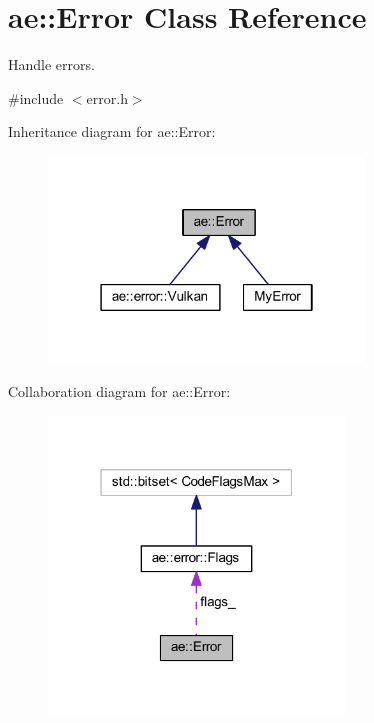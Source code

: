 \hypertarget{classae_1_1_error}{}\section{ae\+:\+:Error Class Reference}
\label{classae_1_1_error}


Handle errors.  




{\ttfamily \#include $<$error.\+h$>$}



Inheritance diagram for ae\+:\+:Error\+:\nopagebreak
\begin{figure}[H]
\begin{center}
\leavevmode
\includegraphics[width=238pt]{classae_1_1_error__inherit__graph}
\end{center}
\end{figure}


Collaboration diagram for ae\+:\+:Error\+:\nopagebreak
\begin{figure}[H]
\begin{center}
\leavevmode
\includegraphics[width=223pt]{classae_1_1_error__coll__graph}
\end{center}
\end{figure}
